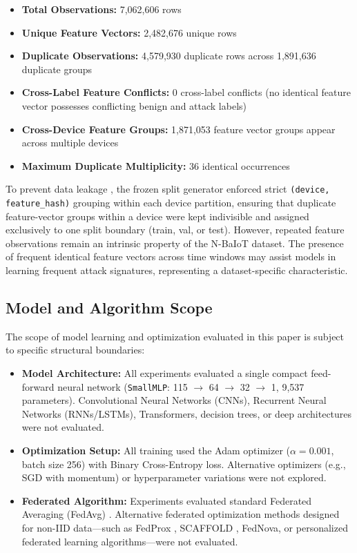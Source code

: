 \documentclass[11pt,a4paper]{article}
\begin{document}
\begin{itemize}
    \item \textbf{Total Observations:} 7,062,606 rows
    \item \textbf{Unique Feature Vectors:} 2,482,676 unique rows
    \item \textbf{Duplicate Observations:} 4,579,930 duplicate rows across 1,891,636 duplicate groups
    \item \textbf{Cross-Label Feature Conflicts:} 0 cross-label conflicts (no identical feature vector possesses conflicting benign and attack labels)
    \item \textbf{Cross-Device Feature Groups:} 1,871,053 feature vector groups appear across multiple devices
    \item \textbf{Maximum Duplicate Multiplicity:} 36 identical occurrences
\end{itemize}

To prevent data leakage \cite{ref8}, the frozen split generator enforced strict \texttt{(device, feature\_hash)} grouping within each device partition, ensuring that duplicate feature-vector groups within a device were kept indivisible and assigned exclusively to one split boundary (train, val, or test). However, repeated feature observations remain an intrinsic property of the N-BaIoT dataset. The presence of frequent identical feature vectors across time windows may assist models in learning frequent attack signatures, representing a dataset-specific characteristic.

\subsection{Model and Algorithm Scope}
The scope of model learning and optimization evaluated in this paper is subject to specific structural boundaries:

\begin{itemize}
    \item \textbf{Model Architecture:} All experiments evaluated a single compact feed-forward neural network (\texttt{SmallMLP}: 115 $\rightarrow$ 64 $\rightarrow$ 32 $\rightarrow$ 1, 9,537 parameters). Convolutional Neural Networks (CNNs), Recurrent Neural Networks (RNNs/LSTMs), Transformers, decision trees, or deep architectures were not evaluated.
    \item \textbf{Optimization Setup:} All training used the Adam optimizer ($\alpha = 0.001$, batch size 256) with Binary Cross-Entropy loss. Alternative optimizers (e.g., SGD with momentum) or hyperparameter variations were not explored.
    \item \textbf{Federated Algorithm:} Experiments evaluated standard Federated Averaging (FedAvg) \cite{ref1}. Alternative federated optimization methods designed for non-IID data—such as FedProx \cite{ref9}, SCAFFOLD \cite{ref10}, FedNova, or personalized federated learning algorithms—were not evaluated.
\end{itemize}
\end{document}
